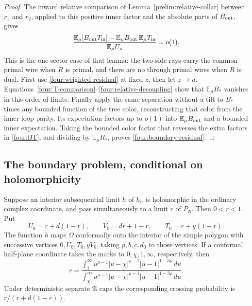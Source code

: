 \begin{proof}
The inward relative comparison of Lemma~\ref{prelim:relative-collar}
between $r_1$ and $r_2$, applied
to this positive inner factor and the absolute parts of $B_{\rm out}$,
gives
\begin{equation}
 \frac{\mathbb E_\mu[B_{\rm out}T_{\rm in}]
 -\mathbb E_\mu B_{\rm out}\,\mathbb E_\mu T_{\rm in}}
 {\mathbb E_\mu U_z}=o(1).
 \label{four:relative-decoupling}
\end{equation}
This is the one-sector case of that lemma: the two side rays carry
the common primal wire when $R$ is primal, and there are no through
primal wires when $R$ is dual.
First use \eqref{four:weighted-residual} at fixed $z$, then let $z\to u$.
Equations~\eqref{four:T-comparison}--\eqref{four:relative-decoupling}
show that $\mathbb E_\mu B_*$ vanishes in this order of limits.
Finally apply the same separation without a tilt to $B_*$ times any
bounded function of the tree color, reconstructing that color from the
inner-loop parity.  Its expectation factors up to $o(1)$ into
$\mathbb E_\mu B_{\rm out}$ and a bounded inner expectation.
Taking the bounded color factor that reverses the extra factors in
\eqref{four:BT}, and dividing by $\mathbb E_\mu R_*$, proves
\eqref{four:boundary-residual}.
\end{proof}

\subsection{The boundary problem, conditional on holomorphicity}

\begin{proposition}
\label{four:conditional-map}
Suppose an interior subsequential limit $h$ of $h_n$ is holomorphic in
the ordinary complex coordinate, and pass simultaneously to a limit
$r$ of $P_{\mathfrak A}$.  Then $0<r<1$.  Put
\begin{equation}
 U_0=r+d(1-r),\qquad V_0=dr+1-r,\qquad T_0=r+y(1-r).
 \label{four:target-vertices}
\end{equation}
The function $h$ maps $\Omega$ conformally onto the interior of the
simple polygon with successive vertices $0,U_0,T_0,yV_0$, taking
$p,b,c,d_0$ to those vertices.  If a conformal half-plane coordinate
takes the marks to $0,\chi,1,\infty$, respectively, then
\begin{equation}
 r=\frac{\displaystyle\int_1^\infty
        u^{\rho-1}|u-\chi|^{\rho-1}|u-1|^{1-3\rho}\,du}
       {\displaystyle\int_\chi^\infty
        u^{\rho-1}|u-\chi|^{\rho-1}|u-1|^{1-3\rho}\,du}.
 \label{four:crossing-formula}
\end{equation}
Under deterministic separate $\mathfrak A$ caps the corresponding
crossing probability is $r/(r+d(1-r))$.
\end{proposition}

